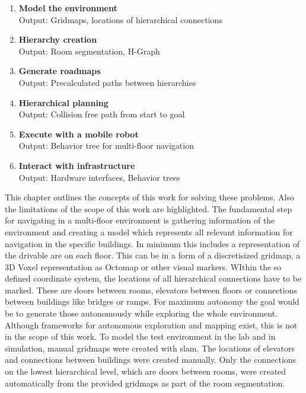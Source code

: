 \begin{enumerate}
    \item \textbf{Model the environment}\\
    Output: Gridmaps, locations of hierarchical connections
    \item \textbf{Hierarchy creation}\\
    Output: Room segmentation, H-Graph
    \item \textbf{Generate roadmaps}\\
    Output: Precalculated paths between hierarchies
    \item \textbf{Hierarchical planning}\\
    Output: Collision free path from start to goal
    \item \textbf{Execute with a mobile robot}\\
    Output: Behavior tree for multi-floor navigation
    \item \textbf{Interact with infrastructure}\\
    Output: Hardware interfaces, Behavior trees
\end{enumerate}

This chapter outlines the concepts of this work for solving these problems. Also the limitations of the scope of this work are highlighted. The fundamental step for navigating in a multi-floor environment is gathering information of the environment and creating a model which represents all relevant information for navigation in the specific buildings. In minimum this includes a representation of the drivable are on each floor. This can be in a form of a discretisized gridmap, a 3D Voxel representation as Octomap \cite{hornung_octomap_2013} or other visual markers. WIthin the so defined coordinate system, the locations of all hierarchical connections have to be marked. These are doors between rooms, elevators between floors or connections between buildings like bridges or ramps. For maximum autonomy the goal would be to generate those autonomously while exploring the whole environment. Although frameworks for autonomous exploration and mapping exist, this is not in the scope of this work. To model the test environment in the lab and in simulation, manual gridmaps were created with \gls{slam}. The locations of elevators and connections between buildings were created manually. Only the connections on the lowest hierarchical level, which are doors between rooms, were created automatically from the provided gridmaps as part of the room segmentation.

